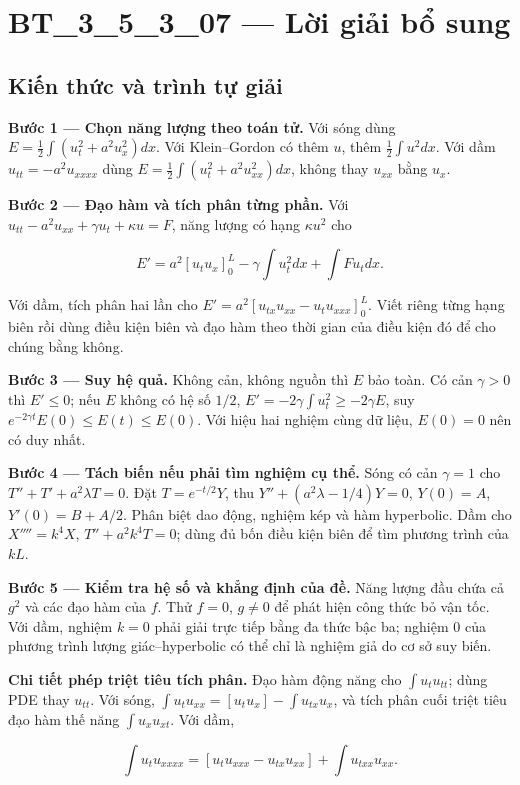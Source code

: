 \documentclass[10pt,a4paper]{article}
\begin{document}
\section*{BT\_3\_5\_3\_07 — Lời giải bổ sung}
\subsection*{Kiến thức và trình tự giải}
\textbf{Bước 1 — Chọn năng lượng theo toán tử.} Với sóng dùng $E=\frac12\int(u_t^2+a^2u_x^2)dx$. Với Klein–Gordon có thêm $u$, thêm $\frac12\int u^2dx$. Với dầm $u_{tt}=-a^2u_{xxxx}$ dùng $E=\frac12\int(u_t^2+a^2u_{xx}^2)dx$, không thay $u_{xx}$ bằng $u_x$.

\textbf{Bước 2 — Đạo hàm và tích phân từng phần.} Với $u_{tt}-a^2u_{xx}+\gamma u_t+\kappa u=F$, năng lượng có hạng $\kappa u^2$ cho


\[
E'=a^2[u_tu_x]_0^L-\gamma\int u_t^2dx+\int Fu_tdx.
\]


Với dầm, tích phân hai lần cho $E'=a^2[u_{tx}u_{xx}-u_tu_{xxx}]_0^L$. Viết riêng từng hạng biên rồi dùng điều kiện biên và đạo hàm theo thời gian của điều kiện đó để cho chúng bằng không.

\textbf{Bước 3 — Suy hệ quả.} Không cản, không nguồn thì $E$ bảo toàn. Có cản $\gamma>0$ thì $E'\le0$; nếu $E$ không có hệ số $1/2$, $E'=-2\gamma\int u_t^2\ge-2\gamma E$, suy $e^{-2\gamma t}E(0)\le E(t)\le E(0)$. Với hiệu hai nghiệm cùng dữ liệu, $E(0)=0$ nên có duy nhất.

\textbf{Bước 4 — Tách biến nếu phải tìm nghiệm cụ thể.} Sóng có cản $\gamma=1$ cho $T''+T'+a^2\lambda T=0$. Đặt $T=e^{-t/2}Y$, thu $Y''+(a^2\lambda-1/4)Y=0$, $Y(0)=A$, $Y'(0)=B+A/2$. Phân biệt dao động, nghiệm kép và hàm hyperbolic. Dầm cho $X''''=k^4X$, $T''+a^2k^4T=0$; dùng đủ bốn điều kiện biên để tìm phương trình của $kL$.

\textbf{Bước 5 — Kiểm tra hệ số và khẳng định của đề.} Năng lượng đầu chứa cả $g^2$ và các đạo hàm của $f$. Thử $f=0$, $g\ne0$ để phát hiện công thức bỏ vận tốc. Với dầm, nghiệm $k=0$ phải giải trực tiếp bằng đa thức bậc ba; nghiệm $0$ của phương trình lượng giác–hyperbolic có thể chỉ là nghiệm giả do cơ sở suy biến.

\textbf{Chi tiết phép triệt tiêu tích phân.} Đạo hàm động năng cho $\int u_tu_{tt}$; dùng PDE thay $u_{tt}$. Với sóng, $\int u_tu_{xx}=[u_tu_x]-\int u_{tx}u_x$, và tích phân cuối triệt tiêu đạo hàm thế năng $\int u_xu_{xt}$. Với dầm,


\[
\int u_tu_{xxxx}=[u_tu_{xxx}-u_{tx}u_{xx}]+\int u_{txx}u_{xx}.
\]
\end{document}
